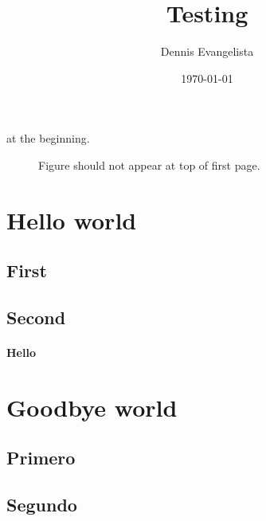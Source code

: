 \documentclass{article}
\title{Testing}
\author{Dennis Evangelista}
\date{\today}
\begin{document}
\maketitle

 at the beginning. %

\begin{figure}[h]
\caption{Figure should not appear at top of first page.} %
\end{figure}

\section{Hello world}
\lipsum[1][1]

\subsection{First}
\lipsum[1][2]

\subsection{Second}
\lipsum[1][3]

\paragraph{Hello} \lipsum[1][4]

\section{Goodbye world}
\lipsum[2][1]

\subsection{Primero}
\lipsum[2][2]

\subsection{Segundo}
\lipsum[2][3]

\begin{fullwidth}
\small\itshape\lipsum[1]
\end{fullwidth}
\end{document}
